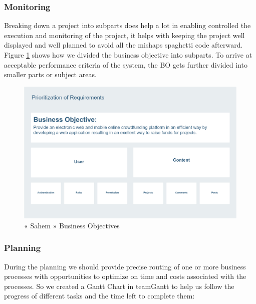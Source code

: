\subsubsection*{Monitoring}
Breaking down a project into subparts does help a lot in enabling controlled the execution and monitoring of the project, it helps with keeping the project well displayed and well planned to avoid all the mishaps spaghetti code afterward.
Figure \ref{fig:bos} shows how we divided the business objective into subparts. To arrive at acceptable performance criteria of the system, the BO gets further divided into smaller parts or subject areas.
\begin{figure}[!ht]
      \center
      \includegraphics[scale=0.18]{assets/bos.png}
      \caption{« Sahem » Business Objectives}
      \label{fig:bos}
\end{figure}

\subsubsection*{Planning}
During the planning we should provide precise routing of one or more business processes with opportunities to optimize on time and costs associated with the processes.
So we created a Gantt Chart in teamGantt to help us follow the progress of different tasks and the time left to complete them:
\clearpage

